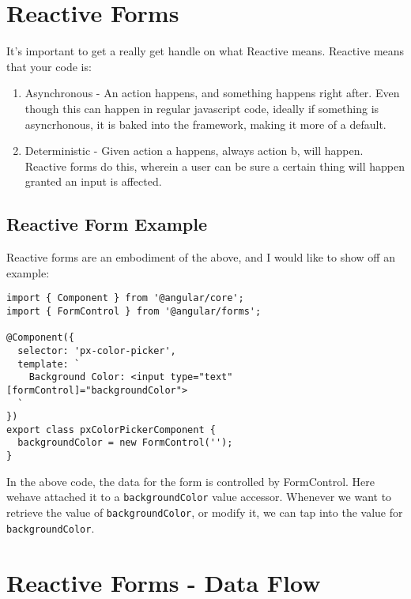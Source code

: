\section{ Reactive Forms }
It's important to get a really get handle on what Reactive means. Reactive means that your code is:
\begin{enumerate}
  \item Asynchronous - An action happens, and something happens right after. 
  Even though this can happen in regular javascript code, ideally if 
  something is asyncrhonous, it is baked into the framework, making it 
  more of a default.
  \item Deterministic -  Given action a happens, always action b, will 
  happen. Reactive forms do this, wherein a user can be sure a certain 
  thing will happen granted an input is affected.
\end{enumerate}

\subsection{ Reactive Form Example }
Reactive forms are an embodiment of the above, and I would like to show off an example: 

\begin{lstlisting}
import { Component } from '@angular/core';
import { FormControl } from '@angular/forms';
  
@Component({
  selector: 'px-color-picker',
  template: `
    Background Color: <input type="text" [formControl]="backgroundColor">
  `
})
export class pxColorPickerComponent {
  backgroundColor = new FormControl('');
}
\end{lstlisting}

In the above code, the data for the form is controlled by FormControl. Here wehave attached it to a \lstinline{backgroundColor} value accessor. Whenever we want to retrieve the value of \lstinline{backgroundColor}, or modify it, we 
can tap into the value for \lstinline{backgroundColor}. 

\section{ Reactive Forms - Data Flow }

